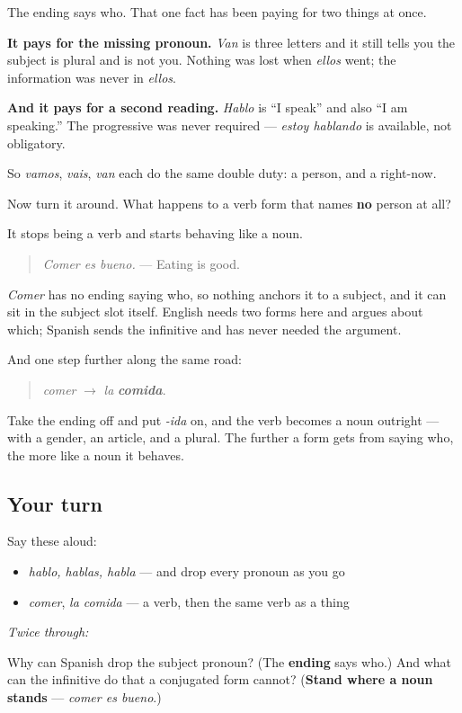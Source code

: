 \begin{grammarlens}[title={What you've built}]
The ending says who. That one fact has been paying for two things at once.

\textbf{It pays for the missing pronoun.} \emph{Van} is three letters and it still tells you the subject is plural and is not you. Nothing was lost when \emph{ellos} went; the information was never in \emph{ellos}.

\textbf{And it pays for a second reading.} \emph{Hablo} is \textquotedblleft{}I speak\textquotedblright{} and also \textquotedblleft{}I am speaking.\textquotedblright{} The progressive was never required — \emph{estoy hablando} is available, not obligatory.

So \emph{vamos}, \emph{vais}, \emph{van} each do the same double duty: a person, and a right-now.
\end{grammarlens}

\begin{culture}
Now turn it around. What happens to a verb form that names \textbf{no} person at all?

It stops being a verb and starts behaving like a noun.

\begin{quote}
\emph{Comer es bueno.} — Eating is good.
\end{quote}

\emph{Comer} has no ending saying who, so nothing anchors it to a subject, and it can sit in the subject slot itself. English needs two forms here and argues about which; Spanish sends the infinitive and has never needed the argument.

And one step further along the same road:

\begin{quote}
\emph{comer} $\to$ \emph{la} \emph{\textbf{comida}}.
\end{quote}

Take the ending off and put \emph{-ida} on, and the verb becomes a noun outright — with a gender, an article, and a plural. The further a form gets from saying who, the more like a noun it behaves.
\end{culture}

\subsection*{Your turn}
Say these aloud:

\begin{itemize}
\raggedright
  \item \emph{hablo, hablas, habla} — and drop every pronoun as you go
  \item \emph{comer}, \emph{la comida} — a verb, then the same verb as a thing
\end{itemize}

\emph{Twice through:}

\begin{tcolorbox}[breakable,colback=teal!4,colframe=teal!35!black,title={Before you move on}]
Why can Spanish drop the subject pronoun? (The \textbf{ending} says who.) And what can the infinitive do that a conjugated form cannot? (\textbf{Stand where a noun stands} — \emph{comer es bueno}.)
\end{tcolorbox}
